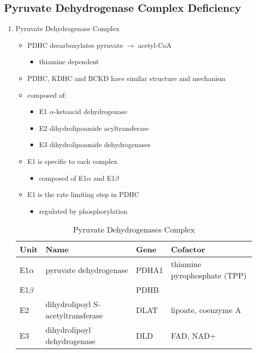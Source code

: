 \documentclass{scrartcl}
\begin{document}
\subsection{Pyruvate Dehydrogenase Complex Deficiency}
\label{sec:org4405999}
\begin{enumerate}
\item Pyruvate Dehydrogenase Complex
\label{sec:orgc15c72b}
\begin{itemize}
\item PDHC decarboxylates pyruvate \(\to\) acetyl-CoA
\begin{itemize}
\item thiamine dependent
\end{itemize}
\item PDHC, KDHC and BCKD have similar structure and mechanism
\item composed of:
\begin{itemize}
\item E1 \(\alpha\)-ketoacid dehydrogenase
\item E2 dihydrolipoamide acyltransferase
\item E3 dihydrolipoamide dehydrogenases
\end{itemize}
\item E1 is specific to each complex
\begin{itemize}
\item composed of E1\(\alpha\) and E1\(\beta\)
\end{itemize}
\item E1 is the rate limiting step in PDHC
\begin{itemize}
\item regulated by phosphorylation
\end{itemize}
\end{itemize}

\begin{table}[htbp]
\caption{\label{tab:orgf286a08}
Pyruvate Dehydrogenases Complex}
\centering
\begin{tabular}{llll}
Unit & Name & Gene & Cofactor\\
\hline
E1\(\alpha\) & pyruvate dehydrogenase & PDHA1 & thiamine pyrophosphate (TPP)\\
E1\(\beta\) &  & PDHB & \\
E2 & dihydrolipoyl  S-acetyltransferase & DLAT & lipoate, coenzyme A\\
E3 & dihydrolipoyl dehydrogenase & DLD & FAD, NAD+\\
\end{tabular}
\end{table}




\end{enumerate}
\end{document}
